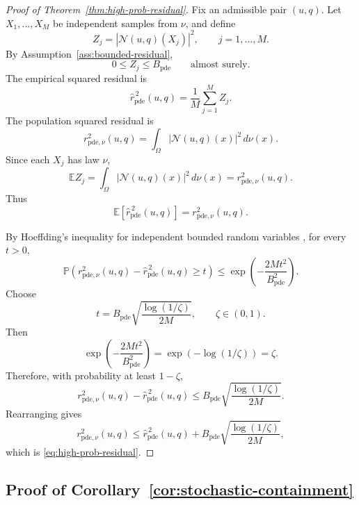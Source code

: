 \documentclass{article}
\numberwithin{equation}{section}
\theoremstyle{definition}
\begin{document}
\begin{proof}[Proof of Theorem~\ref{thm:high-prob-residual}]
Fix an admissible pair \((u,q)\). Let \(X_1,\dots,X_M\) be independent samples from \(\nu\), and define
\[
Z_j
=
\left|\mathcal N(u,q)(X_j)\right|^2,
\qquad
j=1,\dots,M.
\]
By Assumption~\ref{ass:bounded-residual},
\[
0\le Z_j\le B_{\mathrm{pde}}
\qquad
\text{almost surely}.
\]
The empirical squared residual is
\[
\widehat r_{\mathrm{pde}}^{\,2}(u,q)
=
\frac1M\sum_{j=1}^M Z_j.
\]
The population squared residual is
\[
r_{\mathrm{pde},\nu}^{2}(u,q)
=
\int_\Omega
\left|\mathcal N(u,q)(x)\right|^2\,d\nu(x).
\]
Since each \(X_j\) has law \(\nu\),
\[
\mathbb E Z_j
=
\int_\Omega
\left|\mathcal N(u,q)(x)\right|^2\,d\nu(x)
=
r_{\mathrm{pde},\nu}^{2}(u,q).
\]
Thus
\[
\mathbb E\left[\widehat r_{\mathrm{pde}}^{\,2}(u,q)\right]
=
r_{\mathrm{pde},\nu}^{2}(u,q).
\]

By Hoeffding's inequality for independent bounded random variables \cite{Hoeffding1963}, for every \(t>0\),
\[
\mathbb P\left(
r_{\mathrm{pde},\nu}^{2}(u,q)
-
\widehat r_{\mathrm{pde}}^{\,2}(u,q)
\ge t
\right)
\le
\exp\left(
-\frac{2Mt^2}{B_{\mathrm{pde}}^2}
\right).
\]
Choose
\[
t
=
B_{\mathrm{pde}}
\sqrt{\frac{\log(1/\zeta)}{2M}},
\qquad
\zeta\in(0,1).
\]
Then
\[
\exp\left(
-\frac{2Mt^2}{B_{\mathrm{pde}}^2}
\right)
=
\exp\left(-\log(1/\zeta)\right)
=
\zeta.
\]
Therefore, with probability at least \(1-\zeta\),
\[
r_{\mathrm{pde},\nu}^{2}(u,q)
-
\widehat r_{\mathrm{pde}}^{\,2}(u,q)
\le
B_{\mathrm{pde}}
\sqrt{\frac{\log(1/\zeta)}{2M}}.
\]
Rearranging gives
\[
r_{\mathrm{pde},\nu}^{2}(u,q)
\le
\widehat r_{\mathrm{pde}}^{\,2}(u,q)
+
B_{\mathrm{pde}}
\sqrt{\frac{\log(1/\zeta)}{2M}},
\]
which is \eqref{eq:high-prob-residual}.
\end{proof}

\subsection{Proof of Corollary~\ref{cor:stochastic-containment}}
\end{document}
